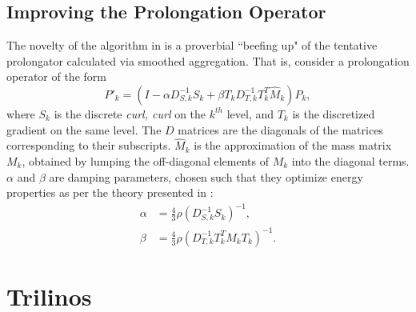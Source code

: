 \documentclass{article}
\begin{document}
\subsection{Improving the Prolongation Operator}
The novelty of the algorithm in \cite{Hu2006} is a proverbial ``beefing up" of the tentative prolongator calculated via smoothed aggregation. That is, consider a prolongation operator of the form
\[
P'_{k} = \left(I-\alpha D_{S,k}^{-1}S_{k}+\beta T_{k}D_{T,k}^{-1}T_{k}^{T}{\hat M}_{k}\right)P_{k},
\]
\noindent where $S_{k}$ is the discrete {\it curl, curl} on the $k^{th}$ level, and $T_{k}$ is the discretized gradient on the same level. The $D$ matrices are the diagonals of the matrices corresponding to their subscripts. ${\hat M}_{k}$ is the approximation of the mass matrix $M_{k}$, obtained by lumping the off-diagonal elements of $M_{k}$ into the diagonal terms. $\alpha$ and $\beta$ are damping parameters, chosen such that they optimize energy properties as per the theory presented in \cite{Brezina2000}:
\begin{align*}
  \alpha &= \frac{4}{3}\rho\left(D_{S,k}^{-1}S_{k}\right)^{-1},\\
  \beta &= \frac{4}{3}\rho\left(D_{T,k}^{-1}T_{k}^{T}M_{k}T_{k}\right)^{-1}.
\end{align*}


\section{Trilinos}




\end{document}
